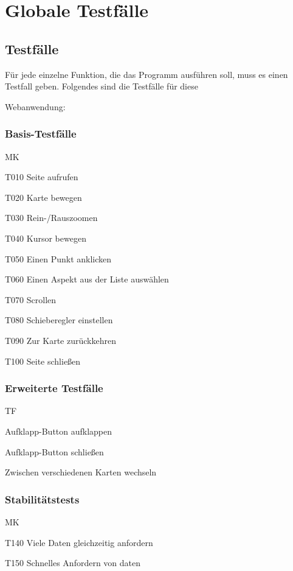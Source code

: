 \section{Globale Testfälle}
\subsection{Testfälle}
\setcounter{counter}{10}

Für jede einzelne Funktion, die das Programm ausführen soll, muss es einen Testfall geben. Folgendes sind die Testfälle für diese 

\gls{Webanwendung}:
\subsubsection{Basis-Testfälle}
\begin{Kriterien}{MK}

	\item[T010] Seite aufrufen

	\item[T020] Karte bewegen
	
	
	\item[T030] Rein-/Rauszoomen
	
	\item[T040] Kursor bewegen
	
	\item[T050] Einen Punkt anklicken
	
	\item[T060] Einen Aspekt aus der Liste auswählen
	
	\item[T070] Scrollen
	
	\item[T080] Schieberegler einstellen
	
	\item[T090] Zur Karte zurückkehren
	
	\item[T100] Seite schließen
\end{Kriterien}
\subsubsection{Erweiterte Testfälle}
\begin{Kriterien}{TF}

	\item Aufklapp-Button aufklappen

	\item Aufklapp-Button schließen
	
	\item Zwischen verschiedenen Karten wechseln
	
\end{Kriterien}
\subsubsection{Stabilitätstests}
\begin{Kriterien}{MK}

	\item[T140] Viele Daten gleichzeitig anfordern

	\item[T150] Schnelles Anfordern von daten
	
\end{Kriterien}
